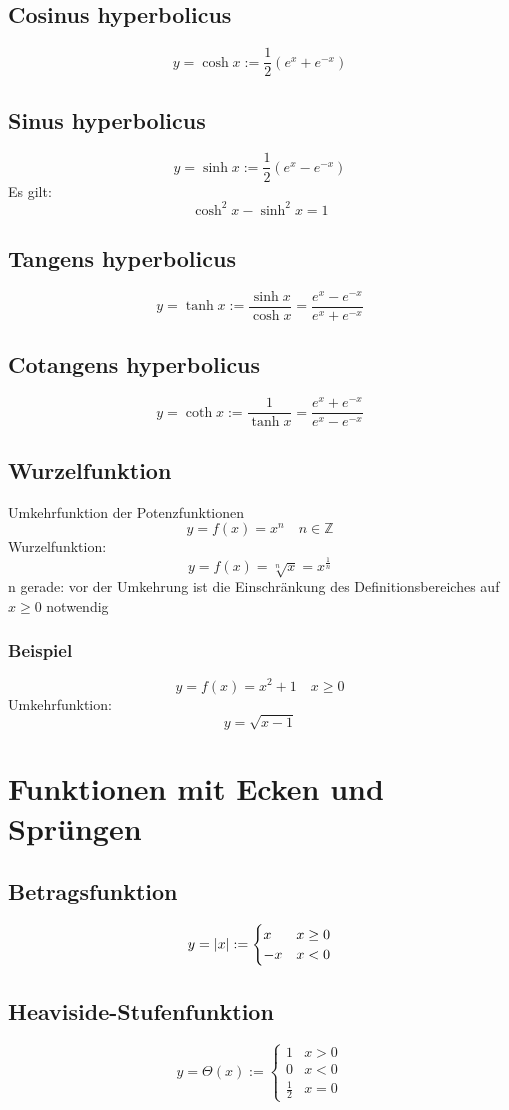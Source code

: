 \documentclass[11pt]{article}
\DeclarePairedDelimiter\abs{\lvert}{\rvert}%
\begin{document}
\subsection{Cosinus hyperbolicus}
\label{sec-5-9}
\[y=\cosh{x}:=\frac{1}{2}\left(e^x + e^{-x}\right)\]
\subsection{Sinus hyperbolicus}
\label{sec-5-10}
\[y=\sinh{x}:=\frac{1}{2}\left(e^x - e^{-x}\right)\]
Es gilt:
\[\cosh^2{x} - \sinh^2{x}=1\]
\subsection{Tangens hyperbolicus}
\label{sec-5-11}
\[y=\tanh{x}:=\frac{\sinh{x}}{\cosh{x}}=\frac{e^x - e^{-x}}{e^x + e^{-x}}\]
\subsection{Cotangens hyperbolicus}
\label{sec-5-12}
\[y=\coth{x}:=\frac{1}{\tanh{x}}=\frac{e^x + e^{-x}}{e^x - e^{-x}}\]
\subsection{Wurzelfunktion}
\label{sec-5-13}
Umkehrfunktion der Potenzfunktionen \[y=f(x)=x^n\quad n\in\mathbb{Z}\]
Wurzelfunktion: \[y=f(x)=\sqrt[n]{x} = x^\frac{1}{n}\]
n gerade: vor der Umkehrung ist die Einschränkung des Definitionsbereiches auf $x\geq 0$ notwendig
\subsubsection{Beispiel}
\label{sec-5-13-1}
\[y=f(x)=x^2 + 1\quad x\geq 0\]
Umkehrfunktion: \[y=\sqrt{x-1}\]
\section{Funktionen mit Ecken und Sprüngen}
\label{sec-6}
\subsection{Betragsfunktion}
\label{sec-6-1}
\[y=\abs{x}:=\begin{cases}x& x \geq 0\\ -x& x < 0\end{cases}\]
\subsection{Heaviside-Stufenfunktion}
\label{sec-6-2}
\[y=\Theta(x):=\begin{cases}1&x>0\\0&x<0\\\frac{1}{2}&x=0\end{cases}\]
\end{document}
